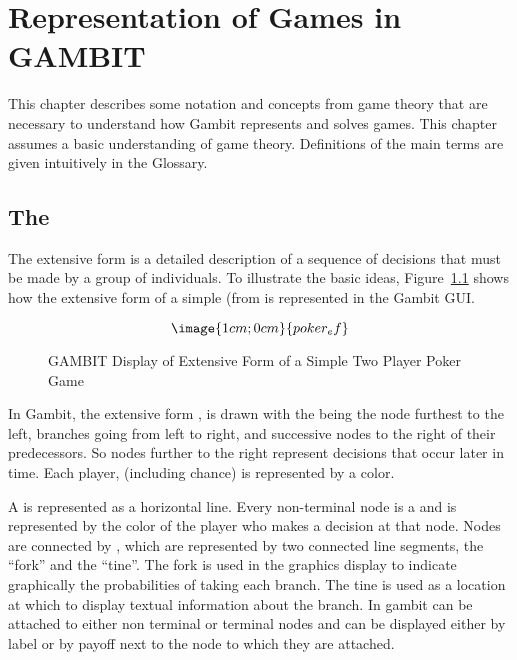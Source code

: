 \chapter{Representation of Games in GAMBIT}

This chapter describes some notation and concepts from game theory
that are necessary to understand how Gambit represents and solves
games.  This chapter assumes a basic understanding of game
theory.  Definitions of the main terms are given intuitively in the
Glossary.

\section{The }\label{extformsec}

The extensive form is a detailed description of a sequence of decisions 
that must be made by a group of individuals. To illustrate the basic ideas,
 Figure~\ref{fig_samp1} 
shows how the extensive form of a simple 
 (from \cite{Mye:91} is represented
 in the Gambit GUI.  

\begin{figure}\label{fig_samp1}
$$\image{1cm;0cm}{poker_ef}$$
\caption{GAMBIT Display of Extensive Form of
		a Simple Two Player Poker Game}\label{fig_samp1}
\end{figure}

In Gambit, the extensive form , is drawn with the 
 being the node furthest to the left,
branches going from left to right, and successive 
nodes to the right of 
their predecessors.  So nodes further to the right represent decisions 
that occur later in time.  Each player, (including chance) is represented by a color.  

A  is represented as a 
horizontal line.  Every non-terminal node is a  
and is represented by the color of the player who makes a decision at that node.  
Nodes are connected by , which are represented by two 
connected line segments, the ``fork'' and the ``tine''.  The fork is used in 
the graphics display to indicate graphically the probabilities of taking each 
branch.  The tine is used as a location at which to display textual information 
about the branch.  In gambit  can 
be attached to either non terminal or terminal nodes and can 
be displayed either by label or by payoff next to the node to 
which they are attached.  

